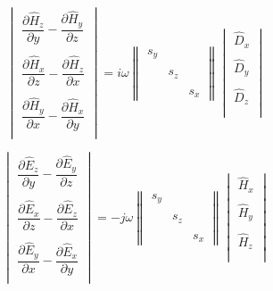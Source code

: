 \documentclass[a4paper,10pt]{article}
\begin{document}
\begin{equation}
  \begin{vmatrix}
 \dfrac{\partial \hat{H}_z}{\partial y} - \dfrac{\partial \hat{H}_y}{\partial z}  \\
\\
 \dfrac{\partial \hat{H}_x}{\partial z} - \dfrac{\partial \hat{H}_z}{\partial x}  \\
\\ 
\dfrac{\partial \hat{H}_y}{\partial x} - \dfrac{\partial \hat{H}_x}{\partial y}  \\
  \end{vmatrix} 
= i \omega \begin{Vmatrix}
 s_y &  &  \\ \\
  & s_z &  \\ \\
  &  & s_x 
\end{Vmatrix} 
 \begin{vmatrix}
 \hat{D}_x \\ \\
 \hat{D}_y \\ \\
 \hat{D}_z \\ \\
  \end{vmatrix}  \label{tensor-Ampere}
\end{equation}

\begin{equation}
 \begin{vmatrix}
 \dfrac{\partial \hat{E}_z}{\partial y} - \dfrac{\partial \hat{E}_y}{\partial z}  \\
\\
 \dfrac{\partial \hat{E}_x}{\partial z} - \dfrac{\partial \hat{E}_z}{\partial x}  \\
\\ 
\dfrac{\partial \hat{E}_y}{\partial x} - \dfrac{\partial \hat{E}_x}{\partial y}  \\
  \end{vmatrix} 
= -j \omega \begin{Vmatrix}
 s_y &  &  \\ \\
  & s_z &  \\ \\
  &  & s_x 
\end{Vmatrix} 
 \begin{vmatrix}
 \hat{H}_x \\ \\
 \hat{H}_y \\ \\
 \hat{H}_z \\ \\
  \end{vmatrix}  \label{tensor-Faraday}
\end{equation}
\end{document}
